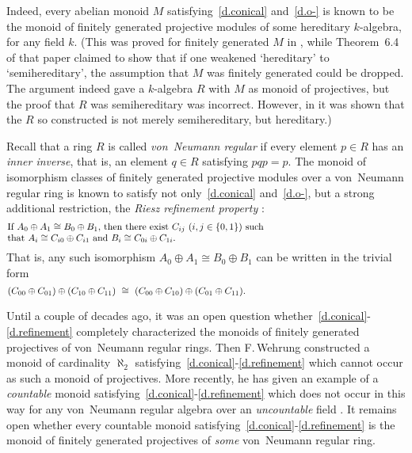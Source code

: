 \documentclass{amsart}
\begin{document}
Indeed, every abelian monoid $M$ satisfying~\eqref{d.conical}
and~\eqref{d.o-} is known to be the monoid of
finitely generated projective modules of some hereditary
$\!k\!$-algebra, for any field $k.$
(This was proved for finitely generated $M$ in
\cite[Theorem~6.2]{cPu}, while Theorem~6.4 of that paper claimed
to show that if one weakened `hereditary'
to `semihereditary', the assumption that $M$ was finitely generated
could be dropped.
The argument indeed gave a $\!k\!$-algebra $R$ with $M$ as monoid
of projectives, but the proof that
$R$ was semihereditary was incorrect.
However, in \cite[Theorem~3.4]{u_deriv&} it was shown
that the $R$ so constructed
is not merely semihereditary, but hereditary.)

Recall that a ring $R$ is called {\em von~Neumann regular}
if every element $p\in R$ has an {\em inner inverse},
that is, an element $q\in R$ satisfying $pqp=p.$
The monoid of isomorphism classes of finitely generated
projective modules over a von~Neumann regular
ring is known to satisfy not only~\eqref{d.conical}
and~\eqref{d.o-}, but a strong additional restriction,
the {\em Riesz refinement property} \cite{separative}:
\begin{equation}\begin{minipage}[c]{35pc}\label{d.refinement}
If $A_0\oplus A_1\cong B_0\oplus B_1,$ then there exist
$C_{ij}$ $(i,j\in\{0,1\})$ such\\
that $A_i\cong C_{i0}\oplus C_{i1}$ and $B_i\cong C_{0i}\oplus C_{1i}.$
\end{minipage}\end{equation}
That is, any such isomorphism $A_0\oplus A_1\cong B_0\oplus B_1$
can be written in the trivial form
\begin{equation}\begin{minipage}[c]{35pc}\label{d.trivO+}
$(C_{00}\oplus C_{01})\oplus (C_{10}\oplus C_{11})\ \cong
\ (C_{00}\oplus C_{10})\oplus (C_{01}\oplus C_{11}).$
\end{minipage}\end{equation}

Until a couple of decades ago, it was an open question
whether~\eqref{d.conical}-\eqref{d.refinement} completely
characterized the monoids of finitely
generated projectives of von~Neumann regular rings.
Then F.\,Wehrung \cite{FW_card}
constructed a monoid of cardinality $\aleph_2$
satisfying~\eqref{d.conical}-\eqref{d.refinement}
which cannot occur as such a monoid of projectives.
More recently, he has given an example of a {\em countable} monoid
satisfying~\eqref{d.conical}-\eqref{d.refinement}
which does not occur in this way
for any von~Neumann regular algebra over an
{\em uncountable} field \cite[\S4]{Ara}.
It remains open whether every countable
monoid satisfying~\eqref{d.conical}-\eqref{d.refinement}
is the monoid of finitely generated projectives
of {\em some} von~Neumann regular ring.
\end{document}
